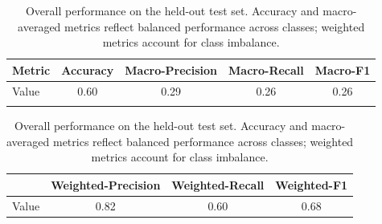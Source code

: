 \begin{table}[t]
  \centering
  \caption{Overall performance on the held-out test set. Accuracy and macro-averaged metrics reflect balanced performance across classes; weighted metrics account for class imbalance.}
  \label{tab:overall-metrics}
  \begin{tabular}{lcccc}
    \toprule
    Metric & Accuracy & Macro-Precision & Macro-Recall & Macro-F1 \\
    \midrule
    Value & 0.60 & 0.29 & 0.26 & 0.26 \\
    \bottomrule\\[-0.75em]
  \end{tabular}
  \vspace{0.5em}
  \begin{tabular}{lccc}
    \toprule
    & Weighted-Precision & Weighted-Recall & Weighted-F1 \\
    \midrule
    Value & 0.82 & 0.60 & 0.68 \\
    \bottomrule
  \end{tabular}
\end{table}
